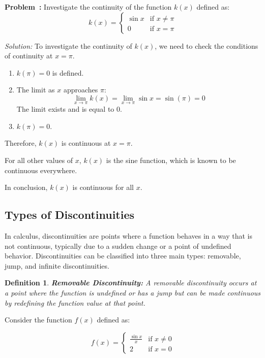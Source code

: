 \documentclass[a4paper,12pt]{book}
\newcounter{problem}
\newenvironment{problem}[1][\theproblem]
{\refstepcounter{problem}\par\medskip\noindent\textbf{Problem~#1:} \rmfamily}{\medskip}
\newenvironment{solution}[1][]
{\par\noindent\textit{Solution:} \rmfamily}{\medskip}
\newtheorem{definition}{Definition}
\begin{document}
\begin{problem}
Investigate the continuity of the function \(k(x)\) defined as:
\[
k(x) =
\begin{cases}
  \sin x & \text{if } x \neq \pi \\
  0 & \text{if } x = \pi
\end{cases}
\]
\end{problem}

\begin{solution}
To investigate the continuity of \(k(x)\), we need to check the conditions of continuity at \(x = \pi\).

\begin{enumerate}
  \item \(k(\pi) = 0\) is defined.
  \item The limit as \(x\) approaches \(\pi\):
  \[
  \lim_{{x \to \pi}} k(x) = \lim_{{x \to \pi}} \sin x = \sin(\pi) = 0
  \]
  The limit exists and is equal to 0.
  \item \(k(\pi) = 0\).
\end{enumerate}

Therefore, \(k(x)\) is continuous at \(x = \pi\).

For all other values of \(x\), \(k(x)\) is the sine function, which is known to be continuous everywhere.

In conclusion, \(k(x)\) is continuous for all \(x\).
\end{solution}

\subsection{Types of Discontinuities}

In calculus, discontinuities are points where a function behaves in a way that is not continuous, typically due to a sudden change or a point of undefined behavior. Discontinuities can be classified into three main types: removable, jump, and infinite discontinuities.

\begin{definition}
\textbf{Removable Discontinuity:} A removable discontinuity occurs at a point where the function is undefined or has a jump but can be made continuous by redefining the function value at that point.
\end{definition}

Consider the function \(f(x)\) defined as:

\[
f(x) =
\begin{cases}
  \frac{\sin x}{x} & \text{if } x \neq 0 \\
  2 & \text{if } x = 0
\end{cases}
\]
\end{document}
